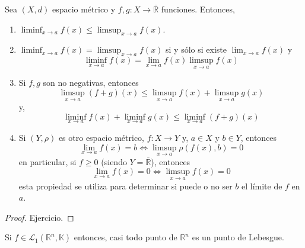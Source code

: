 \documentclass[12pt]{report}
\newcounter{it}
\theoremstyle{largebreak}
\renewcommand{\leq}{\ensuremath{\leqslant}}
\renewcommand{\geq}{\ensuremath{\geqslant}}
\newcommand\cf[3]{\ensuremath{#1:#2\rightarrow#3}}
\begin{document}
    \begin{propo}
        Sea $(X,d)$ espacio métrico y $\cf{f,g}{X}{\overline{\mathbb{R}}}$ funciones. Entonces,
        \begin{enumerate}
            \item $\liminf_{x\rightarrow a}f(x)\leq\limsup_{x\rightarrow a}f(x)$.
            \item $\liminf_{x\rightarrow a}f(x)=\limsup_{x\rightarrow a}f(x)$ si y sólo si existe $\lim_{x\rightarrow a}f(x)$ y
            \begin{equation*}
                \liminf_{x\rightarrow a}f(x)=\lim_{x\rightarrow a}f(x)\limsup_{x\rightarrow a}f(x)
            \end{equation*}
            \item Si $f,g$ son no negativas, entonces
            \begin{equation*}
                \limsup_{x\rightarrow a}(f+g)(x)\leq \limsup_{x\rightarrow a}f(x)+\limsup_{x\rightarrow a}g(x)
            \end{equation*}
            y,
            \begin{equation*}
                \liminf_{x\rightarrow a}f(x)+\liminf_{x\rightarrow a}g(x)\leq \liminf_{x\rightarrow a}(f+g)(x)
            \end{equation*}
            \item Si $(Y,\rho)$ es otro espacio métrico, $\cf{f}{X}{Y}$ y, $a\in X$ y $b\in Y$, entonces
            \begin{equation*}
                \lim_{x\rightarrow a}f(x)=b\iff \limsup_{x\rightarrow a}\rho(f(x),b)=0
            \end{equation*}
            en particular, si $f\geq0$ (siendo $Y=\overline{\mathbb{R}}$), entonces
            \begin{equation*}
                \lim_{x\rightarrow a}f(x)=0\iff \limsup_{x\rightarrow a}f(x)=0
            \end{equation*}
            esta propiedad se utiliza para determinar si puede o no ser $b$ el límite de $f$ en $a$.
        \end{enumerate}
    \end{propo}

    \begin{proof}
        Ejercicio.
    \end{proof}

    \begin{theor}
        Si $f\in\mathcal{L}_1(\mathbb{R}^n,\mathbb{K})$ entonces, casi todo punto de $\mathbb{R}^n$ es un punto de Lebesgue.
    \end{theor}
\end{document}
